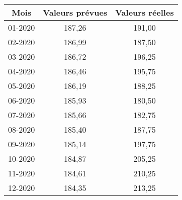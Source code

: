 
\begin{tabular}{ccc}
\toprule
Mois & Valeurs prévues & Valeurs réelles \\
\midrule
01-2020 & 187,26 & 191,00 \\
02-2020 & 186,99 & 187,50 \\
03-2020 & 186,72 & 196,25 \\
04-2020 & 186,46 & 195,75 \\
05-2020 & 186,19 & 188,25 \\
06-2020 & 185,93 & 180,50 \\
07-2020 & 185,66 & 182,75 \\
08-2020 & 185,40 & 187,75 \\
09-2020 & 185,14 & 197,75 \\
10-2020 & 184,87 & 205,25 \\
11-2020 & 184,61 & 210,25 \\
12-2020 & 184,35 & 213,25 \\
\bottomrule
\end{tabular}

